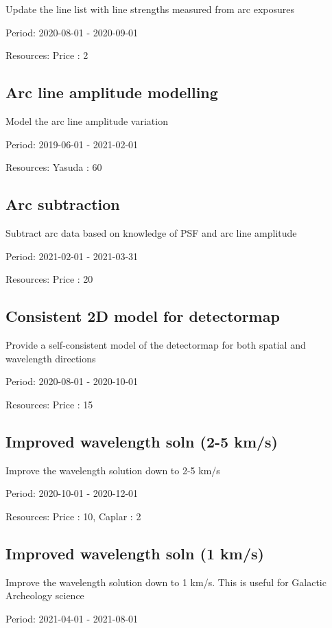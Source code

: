 Update the line list with line strengths measured from arc exposures

Period: 2020-08-01 - 2020-09-01

Resources: Price : 2

\subsection{Arc line amplitude modelling}

Model the arc line amplitude variation

Period: 2019-06-01 - 2021-02-01

Resources: Yasuda : 60

\subsection{Arc subtraction}

Subtract arc data based on knowledge of PSF and arc line amplitude

Period: 2021-02-01 - 2021-03-31

Resources: Price : 20

\subsection{Consistent 2D model for detectormap}

Provide a self-consistent model of the detectormap for both spatial and wavelength directions

Period: 2020-08-01 - 2020-10-01

Resources: Price : 15

\subsection{Improved wavelength soln (2-5 km/s)}

Improve the wavelength solution down to 2-5 km/s

Period: 2020-10-01 - 2020-12-01

Resources: Price : 10, Caplar : 2

\subsection{Improved wavelength soln (1 km/s)}

Improve the wavelength solution down to 1 km/s. This is useful for Galactic Archeology science

Period: 2021-04-01 - 2021-08-01

